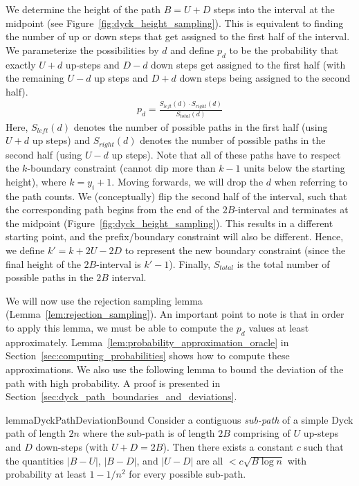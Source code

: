 We determine the height of the path $B = U+D$ steps into the interval at the midpoint (see Figure~\ref{fig:dyck_height_sampling}).
This is equivalent to finding the number of up or down steps that get assigned to the first half of the interval.
We parameterize the possibilities by $d$ and define $p_d$ to be the probability that exactly $U+d$ up-steps and $D-d$ down steps
get assigned to the first half (with the remaining $U-d$ up steps and $D+d$ down steps being assigned to the second half).
\begin{align}
\label{eq:height_sampling_probability}
p_d = \frac{S_{left}(d)\cdot S_{right}(d)}{S_{total}(d)}
\end{align}
Here, $S_{left}(d)$ denotes the number of possible paths in the first half (using $U+d$ up steps)
and $S_{right}(d)$ denotes the number of possible paths in the second half (using $U-d$ up steps).
Note that all of these paths have to respect the $k$-boundary constraint (cannot dip more than $k-1$ units below the starting height), where $k=y_i+1$.
Moving forwards, we will drop the $d$ when referring to the path counts.
We (conceptually) flip the second half of the interval,
such that the corresponding path begins from the end of the $2B$-interval and terminates at the midpoint (Figure~\ref{fig:dyck_height_sampling}).
This results in a different starting point, and the prefix/boundary constraint will also be different.
Hence, we define $k' = k + 2U - 2D$  to represent the new boundary constraint (since the final height of the $2B$-interval is $k'-1$).
Finally, $S_{total}$ is the total number of possible paths in the $2B$ interval.

We will now use the rejection sampling lemma (Lemma~\ref{lem:rejection_sampling}).
An important point to note is that in order to apply this lemma, we must be able to compute the $p_d$ values at least approximately.
Lemma~\ref{lem:probability_approximation_oracle} in Section~\ref{sec:computing_probabilities} shows how to compute these approximations.
We also use the following lemma to bound the deviation of the path with high probability.
A proof is presented in Section~\ref{sec:dyck_path_boundaries_and_deviations}.
\begin{restatable}{lemma}{DyckPathDeviationBound}
\label{lem:DyckPathDeviationBound}
Consider a contiguous \emph{sub-path} of a simple Dyck path of length $2n$
where the sub-path is of length $2B$ comprising of $U$ up-steps and $D$ down-steps (with $U + D = 2B$).
Then there exists a constant $c$ such that the quantities $|B-U|$, $|B-D|$, and $|U-D|$
are all $<c\sqrt{B\log n}$ with probability at least $1-1/n^2$ for every possible sub-path.
\end{restatable}

